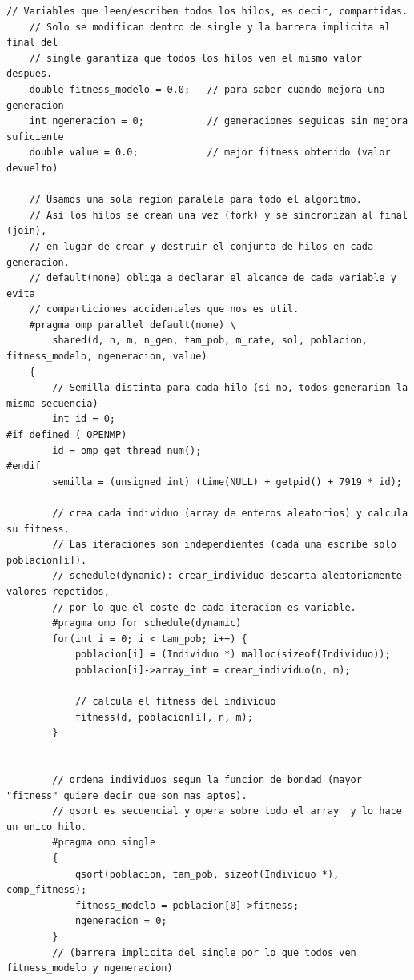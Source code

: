 \documentclass[12pt]{article}
\begin{document}
\begin{lstlisting}[style=EstiloC]
    // Variables que leen/escriben todos los hilos, es decir, compartidas.
    // Solo se modifican dentro de single y la barrera implicita al final del
    // single garantiza que todos los hilos ven el mismo valor despues.
    double fitness_modelo = 0.0;   // para saber cuando mejora una generacion
    int ngeneracion = 0;           // generaciones seguidas sin mejora suficiente
    double value = 0.0;            // mejor fitness obtenido (valor devuelto)

    // Usamos una sola region paralela para todo el algoritmo.
    // Asi los hilos se crean una vez (fork) y se sincronizan al final (join),
    // en lugar de crear y destruir el conjunto de hilos en cada generacion.
    // default(none) obliga a declarar el alcance de cada variable y evita
    // comparticiones accidentales que nos es util.
    #pragma omp parallel default(none) \
        shared(d, n, m, n_gen, tam_pob, m_rate, sol, poblacion, fitness_modelo, ngeneracion, value)
    {
        // Semilla distinta para cada hilo (si no, todos generarian la misma secuencia)
        int id = 0;
#if defined (_OPENMP)
        id = omp_get_thread_num();
#endif
        semilla = (unsigned int) (time(NULL) + getpid() + 7919 * id);

        // crea cada individuo (array de enteros aleatorios) y calcula su fitness.
        // Las iteraciones son independientes (cada una escribe solo poblacion[i]).
        // schedule(dynamic): crear_individuo descarta aleatoriamente valores repetidos,
        // por lo que el coste de cada iteracion es variable.
        #pragma omp for schedule(dynamic)
        for(int i = 0; i < tam_pob; i++) {
            poblacion[i] = (Individuo *) malloc(sizeof(Individuo));
            poblacion[i]->array_int = crear_individuo(n, m);

            // calcula el fitness del individuo
            fitness(d, poblacion[i], n, m);
        }
        

        // ordena individuos segun la funcion de bondad (mayor "fitness" quiere decir que son mas aptos).
        // qsort es secuencial y opera sobre todo el array  y lo hace un unico hilo.
        #pragma omp single
        {
            qsort(poblacion, tam_pob, sizeof(Individuo *), comp_fitness);
            fitness_modelo = poblacion[0]->fitness;
            ngeneracion = 0;
        }
        // (barrera implicita del single por lo que todos ven fitness_modelo y ngeneracion)


\end{lstlisting}
\end{document}
